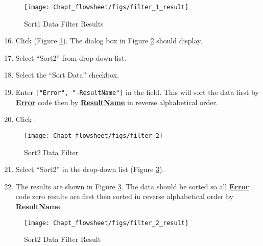\begin{figure}[H]
	\begin{center}
		\texttt{[image: Chapt\_flowsheet/figs/filter\_1\_result]}
		\caption{Sort1 Data Filter Results}
		\label{fig.filter.1.result}
	\end{center}
\end{figure}

\begin{enumerate}
	\setcounter{enumi}{15}
	\item Click  (Figure \ref{fig.filter.1.result}). The dialog box in Figure \ref{fig.filter.2} should display.
	\item Select ``Sort2'' from  drop-down list.
	\item Select the ``Sort Data'' checkbox.
	\item Enter \verb|["Error", "-ResultName"]| in the  field.  This will sort the data first by \textbf{\underline{Error}} code then by \textbf{\underline{ResultName}} in reverse alphabetical order.
	\item Click .
\end{enumerate}

\begin{figure}[H]
	\begin{center}
		\texttt{[image: Chapt\_flowsheet/figs/filter\_2]}
		\caption{Sort2 Data Filter}
		\label{fig.filter.2}
	\end{center}
\end{figure}

\begin{enumerate}
	\setcounter{enumi}{20}
	\item Select ``Sort2'' in the  drop-down list (Figure \ref{fig.filter.2.result}). 
	\item The results are shown in Figure \ref{fig.filter.2.result}. The data should be sorted so all \textbf{\underline{Error}} code zero results are first then sorted in reverse alphabetical order by \textbf{\underline{ResultName}}.
\end{enumerate}

\begin{figure}[H]
	\begin{center}
		\texttt{[image: Chapt\_flowsheet/figs/filter\_2\_result]}
		\caption{Sort2 Data Filter Result}
		\label{fig.filter.2.result}
	\end{center}
\end{figure}

